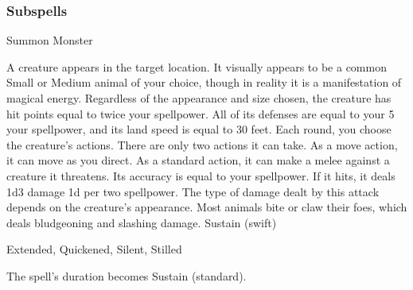 \subsubsection{Subspells}
\begin{spellsection}{Summon Monster}
\begin{spellheader}
\end{spellheader}
\begin{spellcontent}
\begin{spelltargetinginfo}
\end{spelltargetinginfo}
\begin{spelleffects}
\spelleffect
A creature appears in the target location.
It visually appears to be a common Small or Medium animal of your choice, though in reality it is a manifestation of magical energy.
Regardless of the appearance and size chosen, the creature has hit points equal to twice your spellpower.
All of its defenses are equal to your 5 \add your spellpower, and its land speed is equal to 30 feet.
Each round, you choose the creature's actions.
There are only two actions it can take.
As a move action, it can move as you direct.
As a standard action, it can make a melee  against a creature it threatens.
Its accuracy is equal to your spellpower.
If it hits, it deals 1d3 damage \plus1d per two spellpower.
The type of damage dealt by this attack depends on the creature's appearance.
Most animals bite or claw their foes, which deals bludgeoning and slashing damage.
\spelldur Sustain (swift)
\end{spelleffects}
\end{spellcontent}
\begin{spellfooter}
 Extended, Quickened, Silent, Stilled
\end{spellfooter}
\begin{spellsubcontent}
\begin{spellcantrip}
The spell's duration becomes Sustain (standard).
\end{spellcantrip}
\end{spellsubcontent}
\end{spellsection}
